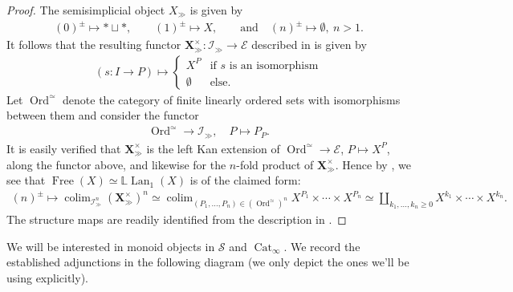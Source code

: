 \documentclass[12pt, reqno]{amsart}
\theoremstyle{plain}
\theoremstyle{definition}
\begin{document}
\begin{proof}
The semisimplicial object $X_\gg$ is given by
\begin{align*}
(0)^\pm \mapsto \ast\sqcup\ast,\qquad (1)^\pm \mapsto X, \qquad \text{and}\quad (n)^\pm \mapsto \emptyset, \ n>1.
\end{align*}
It follows that the resulting functor $\mathbf{X}_\gg^\times\colon \mathcal{I}_\gg\rightarrow \mathcal{E}$ described in  is given by
\begin{align*}
(s\colon I\rightarrow P) \mapsto \begin{cases}
X^P & \text{if } s \text{ is an isomorphism} \\
\emptyset & \text{else}.
\end{cases}
\end{align*}
Let $\operatorname{Ord}^{\simeq}$ denote the category of finite linearly ordered sets with isomorphisms between them and consider the functor
\begin{align*}
\operatorname{Ord}^{\simeq}\rightarrow \mathcal{I}_\gg,\quad P\mapsto P_P.
\end{align*}
It is easily verified that $\mathbf{X}_\gg^\times$ is the left Kan extension of $\operatorname{Ord}^{\simeq}\rightarrow \mathcal{E}$, $P\mapsto X^P$, along the functor above, and likewise for the $n$-fold product of $\mathbf{X}_\gg^\times$. Hence by , we see that $\operatorname{Free}(X)\simeq \mathbb{L}\operatorname{Lan}_1(X)$ is of the claimed form:
\begin{align*}
(n)^\pm \mapsto \mathop{\operatorname{colim}}_{\mathcal{I}_\gg^n} (\mathbf{X}_\gg^\times)^n \simeq \mathop{\operatorname{colim}}_{(P_1,\ldots,P_n)\in (\operatorname{Ord}^{\simeq})^n} X^{P_1}\times \cdots \times X^{P_n}\simeq \coprod_{k_1,\ldots,k_n\geq 0} X^{k_1}\times \cdots \times X^{k_n}.
\end{align*}
The structure maps are readily identified from the description in .
\end{proof}

We will be interested in monoid objects in $\mathcal{S}$ and $\operatorname{Cat}_\infty$. We record the established adjunctions in the following diagram (we only depict the ones we'll be using explicitly).
\end{document}
